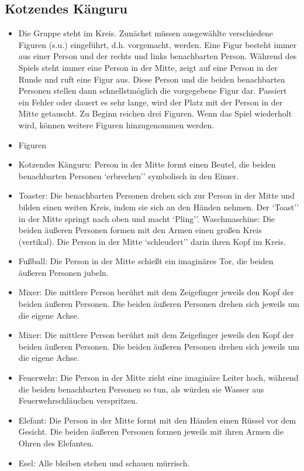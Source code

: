 \documentclass[a4paper, 11pt]{article}
\begin{document}
\subsection{Kotzendes Känguru}
\begin{itemize}
    \item Die Gruppe steht im Kreis. Zunächst müssen ausgewählte verschiedene Figuren (s.u.) eingeführt, d.h. vorgemacht, werden. Eine Figur besteht immer aus einer Person und der rechts und links benachbarten Person.
    Während des Spiels steht immer eine Person in der Mitte, zeigt auf eine Person in der Runde und ruft eine Figur aus. Diese Person und die beiden benachbarten Personen stellen dann schnellstmöglich die vorgegebene Figur dar. Passiert ein Fehler oder dauert es sehr lange, wird der Platz mit der Person in der Mitte getauscht.
    Zu Beginn reichen drei Figuren. Wenn das Spiel wiederholt wird, können weitere Figuren hinzugenommen werden.
    \item Figuren 
    \item Kotzendes Känguru: Person in der Mitte formt einen Beutel, die beiden benachbarten Personen `erbrechen'' symbolisch in den Eimer.
    \item Toaster: Die benachbarten Personen drehen sich zur Person in der Mitte und bilden einen weiten Kreis, indem sie sich an den Händen nehmen. Der `Toast'' in der Mitte springt nach oben und macht `Pling''.
    Waschmaschine: Die beiden äußeren Personen formen mit den Armen einen großen Kreis (vertikal). Die Person in der Mitte `schleudert'' darin ihren Kopf im Kreis.
    \item Fußball: Die Person in der Mitte schießt ein imaginäres Tor, die beiden äußeren Personen jubeln.
    \item  Mixer: Die mittlere Person berührt mit dem Zeigefinger jeweils den Kopf der beiden äußeren Personen. Die beiden äußeren Personen drehen sich jeweils um die eigene Achse.
    \item  Mixer: Die mittlere Person berührt mit dem Zeigefinger jeweils den Kopf der beiden äußeren Personen. Die beiden äußeren Personen drehen sich jeweils um die eigene Achse.
    \item Feuerwehr: Die Person in der Mitte zieht eine imaginäre Leiter hoch, während die beiden benachbarten Personen so tun, als würden sie Wasser aus Feuerwehrschläuchen verspritzen.
    \item Elefant: Die Person in der Mitte formt mit den Händen einen Rüssel vor dem Gesicht. Die beiden äußeren Personen formen jeweils mit ihren Armen die Ohren des Elefanten.
    \item Esel: Alle bleiben stehen und schauen mürrisch. 
\end{itemize}
\end{document}
